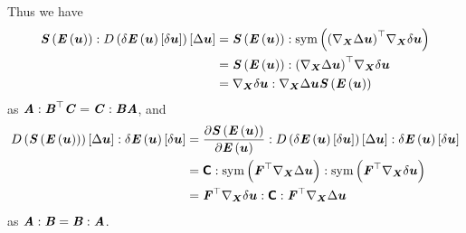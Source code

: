 Thus we have
\begin{equation}
  \begin{split}
    \doubledotprod{\fnof{\tensor{S}}{\fnof{\tensor{E}}{\vectr{u}}}}{\directionalderiv{}{\variation{\fnof{\tensor{E}}{\vectr{u}}}{\vectr{u}}}{\linearisationdir{\vectr{u}}}}&=
    \doubledotprod{\fnof{\tensor{S}}{\fnof{\tensor{E}}{\vectr{u}}}}{\symop\pbrac{\transpose{\pbrac{\gradient{\vectr{X}}{\linearisationdir{\vectr{u}}}}}\gradient{\vectr{X}}{\variationdir{\vectr{u}}}}}\\
    &=\doubledotprod{\fnof{\tensor{S}}{\fnof{\tensor{E}}{\vectr{u}}}}{\transpose{\pbrac{\gradient{\vectr{X}}{\linearisationdir{\vectr{u}}}}}\gradient{\vectr{X}}{\variationdir{\vectr{u}}}}\\
    &=\doubledotprod{\gradient{\vectr{X}}{\variationdir{\vectr{u}}}}{\gradient{\vectr{X}}{\linearisationdir{\vectr{u}}}\fnof{\tensor{S}}{\fnof{\tensor{E}}{\vectr{u}}}}
  \end{split}
\end{equation}
as
$ \boldsymbol{\mathit{A}} :  {\boldsymbol{\mathit{B}}}^{ \top } \boldsymbol{\mathit{C}} = \boldsymbol{\mathit{C}} : \boldsymbol{\mathit{B}}\boldsymbol{\mathit{A}} $, and
\begin{equation}
  \begin{split}
    \doubledotprod{\directionalderiv{}{\fnof{\tensor{S}}{\fnof{\tensor{E}}{\vectr{u}}}}{\linearisationdir{\vectr{u}}}}{\variation{\fnof{\tensortwo{E}}{\vectr{u}}}{\vectr{u}}}
    &=\doubledotprod{\doubledotprod{\delby{\fnof{\tensor{S}}{\fnof{\tensor{E}}{\vectr{u}}}}{\fnof{\tensor{E}}{\vectr{u}}}}{\directionalderiv{}{\variation{\fnof{\tensor{E}}{\vectr{u}}}{\vectr{u}}}{\linearisationdir{\vectr{u}}}}}{\variation{\fnof{\tensor{E}}{\vectr{u}}}{\vectr{u}}}\\
    &=\doubledotprod{\doubledotprod{\tensorfour{C}}{\symop\pbrac{\transpose{\tensortwo{F}}\gradient{\vectr{X}}{\linearisationdir{\vectr{u}}}}}}{\symop\pbrac{\transpose{\tensortwo{F}}\gradient{\vectr{X}}{\variationdir{\vectr{u}}}}}\\
    &=\doubledotprod{\transpose{\tensortwo{F}}\gradient{\vectr{X}}{\variationdir{\vectr{u}}}}{\doubledotprod{\tensorfour{C}}{\transpose{\tensortwo{F}}\gradient{\vectr{X}}{\linearisationdir{\vectr{u}}}}}
  \end{split}
\end{equation}
as
$ \boldsymbol{\mathit{A}} : \boldsymbol{\mathit{B}} = \boldsymbol{\mathit{B}} : \boldsymbol{\mathit{A}} $.

